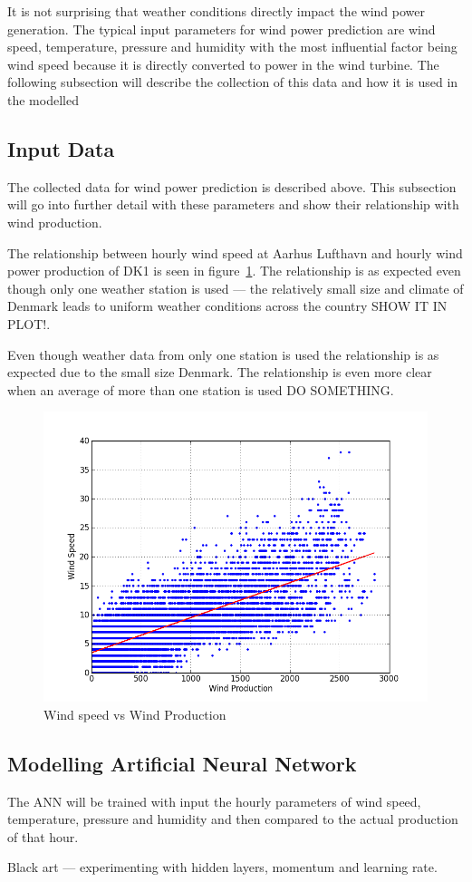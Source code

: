It is not surprising that weather conditions directly impact the wind power generation. The typical input parameters for wind power prediction are wind speed, temperature, pressure and humidity \cite{WindPowerGenerationUsingANN} with the most influential factor being wind speed because it is directly converted to power in the wind turbine. The following subsection will describe the collection of this data and how it is used in the modelled 

\subsection{Input Data}
The collected data for wind power prediction is described above. This subsection will go into further detail with these parameters and show their relationship with wind production.

The relationship between hourly wind speed at Aarhus Lufthavn and hourly wind power production of DK1 is seen in figure~\ref{fig:windVsProd}. The relationship is as expected even though only one weather station is used --- the relatively small size and climate of Denmark leads to uniform weather conditions across the country SHOW IT IN PLOT!.

Even though weather data from only one station is used the relationship is as expected due to the small size Denmark. The relationship is even more clear when an average of more than one station is used DO SOMETHING.  

\begin{figure}[h!]
\centering
\includegraphics[width=0.99\linewidth,natwidth=898,natheight=587]{billeder/WindSpeedVsProduction.png}
\caption{Wind speed vs Wind Production}
\label{fig:windVsProd}
\end{figure}

\subsection{Modelling Artificial Neural Network}
The ANN will be trained with input the hourly parameters of wind speed, temperature, pressure and humidity and then compared to the actual production of that hour.

Black art --- experimenting with hidden layers, momentum and learning rate. 